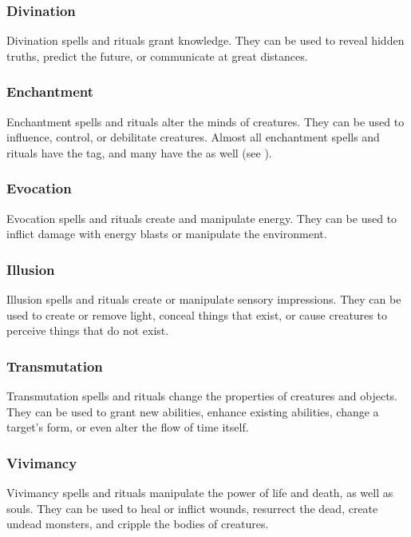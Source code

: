         \subsubsection{Divination}
            Divination spells and rituals grant knowledge.
            They can be used to reveal hidden truths, predict the future, or communicate at great distances.

        \subsubsection{Enchantment}
            Enchantment spells and rituals alter the minds of creatures.
            They can be used to influence, control, or debilitate creatures.
            Almost all enchantment spells and rituals have the  tag, and many have the  as well (see ).

        \subsubsection{Evocation}
            Evocation spells and rituals create and manipulate energy.
            They can be used to inflict damage with energy blasts or manipulate the environment.

        \subsubsection{Illusion}
            Illusion spells and rituals create or manipulate sensory impressions.
            They can be used to create or remove light, conceal things that exist, or cause creatures to perceive things that do not exist.

        \subsubsection{Transmutation}
            Transmutation spells and rituals change the properties of creatures and objects.
            They can be used to grant new abilities, enhance existing abilities, change a target's form, or even alter the flow of time itself.

        \subsubsection{Vivimancy}
            Vivimancy spells and rituals manipulate the power of life and death, as well as souls.
            They can be used to heal or inflict wounds, resurrect the dead, create undead monsters, and cripple the bodies of creatures.

